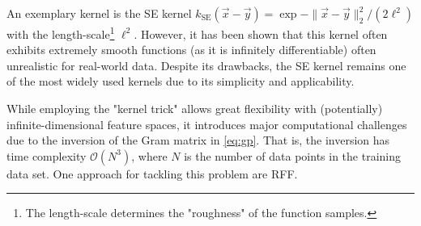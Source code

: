 	An exemplary kernel is the \ac{SE} kernel \( k_\mathrm{SE}(\vec{x} - \vec{y}) = \exp{ -\lVert \vec{x} - \vec{y} \rVert_2^2 / (2 \ell^2) } \) with the length-scale\footnote{The length-scale determines the "roughness" of the function samples\cite[p.\,15]{rasmussenGaussianProcessesMachine2006}.} \(\ell^2\).
	However, it has been shown that this kernel often exhibits extremely smooth functions (as it is infinitely differentiable) often unrealistic for real-world data\cite{steinInterpolationSpatialData1999}.
	Despite its drawbacks, the \ac{SE} kernel remains one of the most widely used kernels due to its simplicity and applicability\cite[p.\,83]{rasmussenGaussianProcessesMachine2006}.

	While employing the "kernel trick" allows great flexibility with (potentially) infinite-dimensional feature spaces, it introduces major computational challenges due to the inversion of the Gram matrix in \cref{eq:gp}.
	That is, the inversion has time complexity \( \mathcal{O}(N^3) \), where \(N\) is the number of data points in the training data set.
	One approach for tackling this problem are \acl{RFF}.
